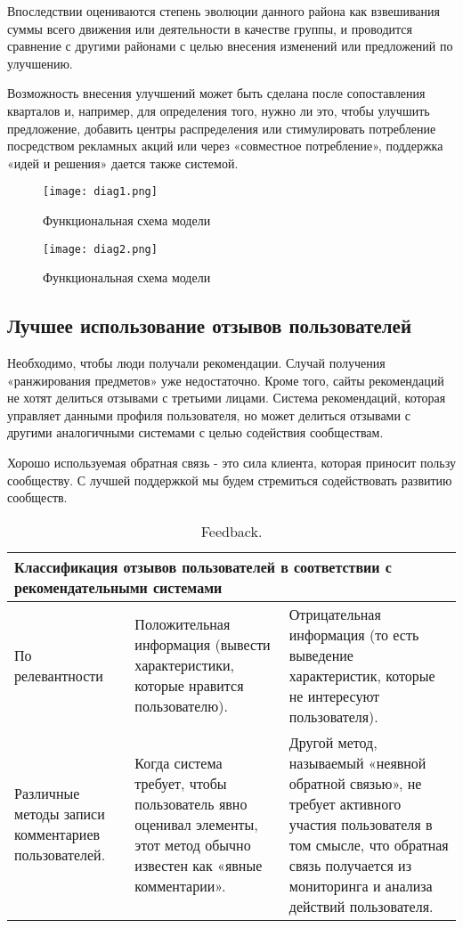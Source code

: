 Впоследствии оцениваются степень эволюции данного района как взвешивания суммы всего движения или деятельности в качестве группы, и проводится сравнение с другими районами с целью внесения изменений или предложений по улучшению.

Возможность внесения улучшений может быть сделана после сопоставления кварталов и, например, для определения того, нужно ли это, чтобы улучшить предложение, добавить центры распределения или стимулировать потребление посредством рекламных акций или через «совместное потребление», поддержка «идей и решения» дается также системой.

\begin{figure}[h]
  \centering
  \texttt{[image: diag1.png]}
  \caption{Функциональная схема модели}
  \label{image:scheme3}
\end{figure}

\begin{figure}[h]
  \centering
  \texttt{[image: diag2.png]}
  \caption{Функциональная схема модели}
  \label{image:4}
\end{figure}
\hfill \break


\subsection{Лучшее использование отзывов пользователей}
Необходимо, чтобы люди получали рекомендации. Случай получения «ранжирования предметов» уже недостаточно. Кроме того, сайты рекомендаций не хотят делиться отзывами с третьими лицами. Система рекомендаций, которая управляет данными профиля пользователя, но может делиться отзывами с другими аналогичными системами с целью содействия сообществам.

Хорошо используемая обратная связь - это сила клиента, которая приносит пользу сообществу. С лучшей поддержкой мы будем стремиться содействовать развитию сообществ.

\begin{table}[]
\centering
\begin{tabular}{|p{2cm}|p{6cm}|p{6cm}|}
\hline
\multicolumn{3}{|p{14cm}|}{Классификация отзывов пользователей в соответствии с рекомендательными системами} \\ \hline
По релевантности       & Положительная информация (вывести характеристики, которые нравится пользователю).      &  Отрицательная информация (то есть выведение характеристик, которые не интересуют пользователя).      \\ \hline
Различные методы записи комментариев пользователей.       & Когда система требует, чтобы пользователь явно оценивал элементы, этот метод обычно известен как «явные комментарии».      &  Другой метод, называемый «неявной обратной связью», не требует активного участия пользователя в том смысле, что обратная связь получается из мониторинга и анализа действий пользователя.      \\ \hline
\end{tabular}
\centering
\caption{Feedback.}
\centering
\label{tabla:sencilla1}
\end{table}

